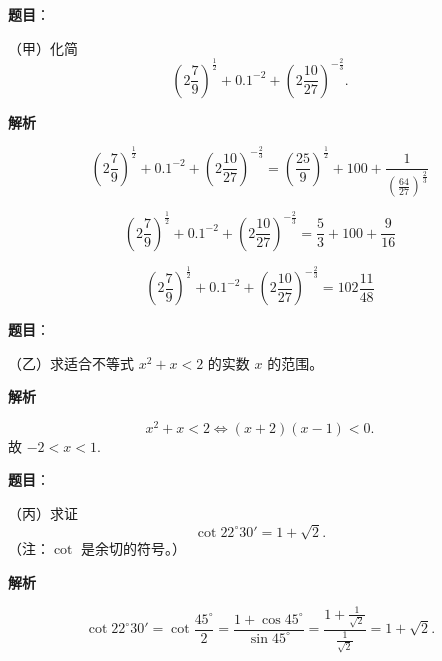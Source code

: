 


\begin{answer}

\textbf{题目}：

（甲）化简
\nopagebreak[4]
\[
\left(2\frac79\right)^{\frac12}+0.1^{-2}+\left(2\frac{10}{27}\right)^{-\frac23}.
\]

\textbf{解析}

\nopagebreak[4]
\[
\left(2\frac79\right)^{\frac12}+0.1^{-2}+\left(2\frac{10}{27}\right)^{-\frac23}
=\left(\frac{25}{9}\right)^{\frac12}+100+\frac{1}{\left(\frac{64}{27}\right)^{\frac23}}
\]

\nopagebreak[4]
\[
\left(2\frac79\right)^{\frac12}+0.1^{-2}+\left(2\frac{10}{27}\right)^{-\frac23}
=\frac53+100+\frac9{16}
\]

\nopagebreak[4]
\[
\left(2\frac79\right)^{\frac12}+0.1^{-2}+\left(2\frac{10}{27}\right)^{-\frac23}
=102\frac{11}{48}
\]


\end{answer}
\begin{answer}

\textbf{题目}：

（乙）求适合不等式 $x^2+x<2$ 的实数 $x$ 的范围。

\textbf{解析}

\nopagebreak[4]
\[
x^2+x<2
\iff (x+2)(x-1)<0.
\]
故 $-2<x<1$.


\end{answer}
\begin{answer}

\textbf{题目}：

（丙）求证
\nopagebreak[4]
\[
\cot22^\circ30'=1+\sqrt2.
\]
（注：$\cot$ 是余切的符号。）

\textbf{解析}

\nopagebreak[4]
\[
\cot22^\circ30'=\cot\frac{45^\circ}{2}
=\frac{1+\cos45^\circ}{\sin45^\circ}
=\frac{1+\frac1{\sqrt2}}{\frac1{\sqrt2}}
=1+\sqrt2.
\]


\end{answer}

